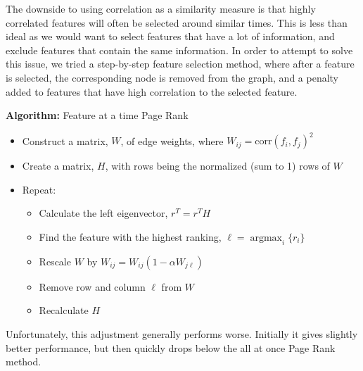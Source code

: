 \documentclass[12pt]{article}
\DeclareMathOperator*{\argmax}{argmax}
\begin{document}
The downside to using correlation as a similarity measure is that highly correlated features will often be selected around similar times.  This is less than ideal as we would want to select features that have a lot of information, and exclude features that contain the same information.  In order to attempt to solve this issue, we tried a step-by-step feature selection method, where after a feature is selected, the corresponding node is removed from the graph, and a penalty added to features that have high correlation to the selected feature.

\hrulefill

\textbf{Algorithm:} Feature at a time Page Rank
\begin{itemize}
\item Construct a matrix, $W$, of edge weights, where $W_{ij} = \text{corr}(f_i,f_j)^2$
\item Create a matrix, $H$, with rows being the normalized (sum to 1) rows of $W$
\item Repeat:
\begin{itemize}
\item Calculate the left eigenvector, $r^T = r^T H$
\item Find the feature with the highest ranking, $\ell = \argmax_i\{r_i\}$
\item Rescale $W$ by $W_{ij} = W_{ij} (1 - \alpha W_{j\ell})$
\item Remove row and column $\ell$ from $W$
\item Recalculate $H$
\end{itemize}
\end{itemize}
\hrulefill

Unfortunately, this adjustment generally performs worse.  Initially it gives slightly better performance, but then quickly drops below the all at once Page Rank method.
\end{document}
